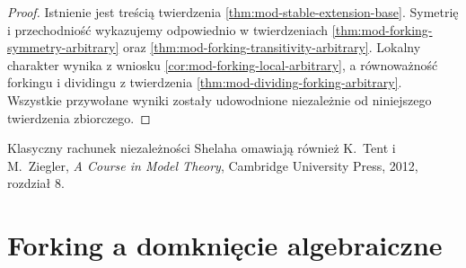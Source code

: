 \begin{proof}
Istnienie jest treścią twierdzenia
\ref{thm:mod-stable-extension-base}.
Symetrię i przechodniość wykazujemy
odpowiednio w twierdzeniach
\ref{thm:mod-forking-symmetry-arbitrary}
oraz \ref{thm:mod-forking-transitivity-arbitrary}.
Lokalny charakter wynika z wniosku
\ref{cor:mod-forking-local-arbitrary},
a równoważność forkingu i dividingu
z twierdzenia \ref{thm:mod-dividing-forking-arbitrary}.
Wszystkie przywołane wyniki zostały udowodnione
niezależnie od niniejszego twierdzenia zbiorczego.
\end{proof}

Klasyczny rachunek niezależności Shelaha
omawiają również K.~Tent i M.~Ziegler,
\emph{A Course in Model Theory},
Cambridge University Press, 2012, rozdział 8.

\section{Forking a domknięcie algebraiczne}

